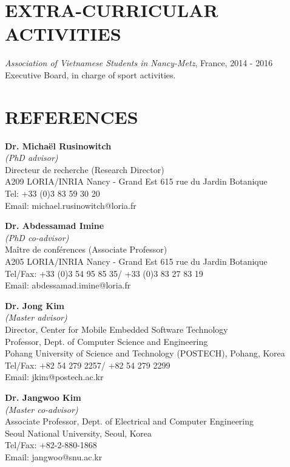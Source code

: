 \documentclass[margin, 10pt]{res} %
\begin{document}
\begin{resume}
\section{EXTRA-CURRICULAR \\ ACTIVITIES} 
\textit{Association of Vietnamese Students in Nancy-Metz}, France, \hfill 2014 - 2016\\
Executive Board, in charge of sport activities.

 

\section{REFERENCES}
\textbf{Dr. Micha\"{e}l Rusinowitch} \\
\textit{(PhD advisor)} \\
Directeur de recherche (Research Director) \\
A209 LORIA/INRIA Nancy - Grand Est 615 rue du Jardin Botanique \\
Tel: +33 (0)3 83 59 30 20 \\
Email: michael.rusinowitch@loria.fr


\textbf{Dr. Abdessamad Imine} \\
\textit{(PhD co-advisor)} \\
Maître de conférences (Associate Professor) \\
A205 LORIA/INRIA Nancy - Grand Est 615 rue du Jardin Botanique \\
Tel/Fax: +33 (0)3 54 95 85 35/ +33 (0)3 83 27 83 19 \\
Email: abdessamad.imine@loria.fr


\textbf{Dr. Jong Kim} \\
\textit{(Master advisor)} \\
Director, Center for Mobile Embedded Software Technology \\
Professor, Dept. of Computer Science and Engineering \\
Pohang University of Science and Technology (POSTECH), Pohang, Korea \\
Tel/Fax: +82 54 279 2257/ +82 54 279 2299 \\
Email: jkim@postech.ac.kr  


\textbf{Dr. Jangwoo Kim} \\
\textit{(Master co-advisor)} \\
Associate Professor, Dept. of Electrical and Computer Engineering \\
Seoul National University, Seoul, Korea \\
Tel/Fax: +82-2-880-1868 \\
Email: jangwoo@snu.ac.kr 




\end{resume}
\end{document}
